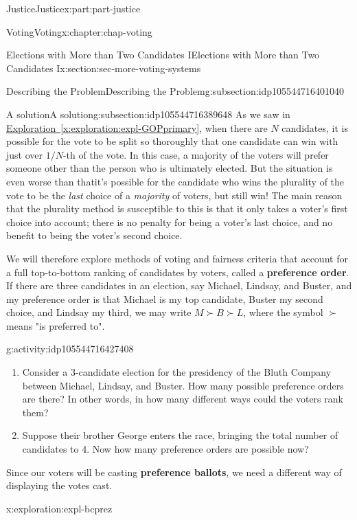 \documentclass[oneside,10pt,]{book}
\newcommand{\xreffont}{\relax}
\newcommand{\terminology}[1]{\textbf{#1}}
\numberwithin{equation}{section}
\begin{document}
\begin{partptx}{Justice}{}{Justice}{}{}{x:part:part-justice}
\begin{chapterptx}{Voting}{}{Voting}{}{}{x:chapter:chap-voting}
\begin{sectionptx}{Elections with More than Two Candidates I}{}{Elections with More than Two Candidates I}{}{}{x:section:sec-more-voting-systems}
\begin{subsectionptx}{Describing the Problem}{}{Describing the Problem}{}{}{g:subsection:idp105544716401040}
\end{subsectionptx}
%
%
\typeout{************************************************}
\typeout{************************************************}
%
\begin{subsectionptx}{A solution}{}{A solution}{}{}{g:subsection:idp105544716389648}
As we saw in \hyperref[x:exploration:expl-GOPprimary]{Exploration~{\xreffont\ref{x:exploration:expl-GOPprimary}}}, when there are \(N\) candidates, it is possible for the vote to be split so thoroughly that one candidate can win with just over \(1/N\)-th of the vote. In this case, a majority of the voters will prefer someone other than the person who is ultimately elected. But the situation is even worse than that\textemdash{}it's possible for the candidate who wins the plurality of the vote to be the \emph{last} choice of a \emph{majority} of voters, but still win! The main reason that the plurality method is susceptible to this is that it only takes a voter's first choice into account; there is no penalty for being a voter's last choice, and no benefit to being the voter's second choice.%
\par
{} We will therefore explore methods of voting and fairness criteria that account for a full top-to-bottom ranking of candidates by voters, called a \terminology{preference order}. If there are three candidates in an election, say Michael, Lindsay, and Buster, and my preference order is that Michael is my top candidate, Buster my second choice, and Lindsay my third, we may write \(M \succ B \succ L\), where the symbol \(\succ\) means "is preferred to".%
\begin{activity}{}{g:activity:idp105544716427408}%
%
\begin{enumerate}
\item{}Consider a 3-candidate election for the presidency of the Bluth Company between Michael, Lindsay, and Buster. How many possible preference orders are there? In other words, in how many different ways could the voters rank them?%
\item{}Suppose their brother George enters the race, bringing the total number of candidates to 4. Now how many preference orders are possible now?%
\end{enumerate}
\end{activity}%
 Since our voters will be casting \terminology{preference ballots}, we need a different way of displaying the votes cast.%
\begin{exploration}{}{x:exploration:expl-bcprez}%

\end{exploration}
\end{subsectionptx}
\end{sectionptx}
\end{chapterptx}
\end{partptx}
\end{document}
